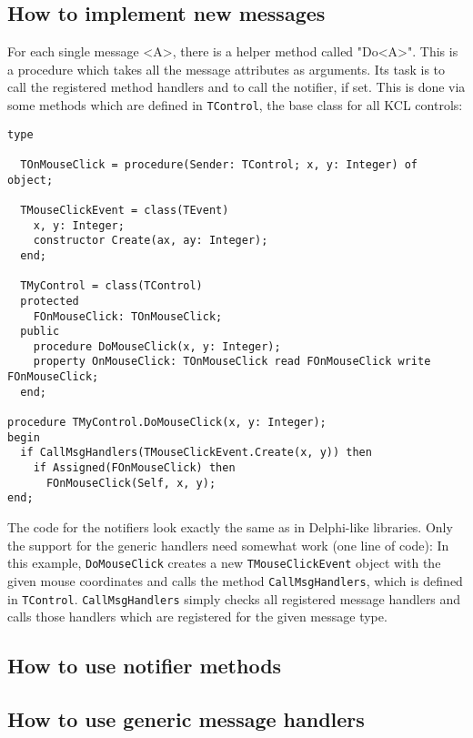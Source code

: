 \documentclass{report}
\begin{document}
\subsection{How to implement new messages}

For each single message <A>, there is a helper method called "Do<A>". This is a
procedure which takes all the message attributes as arguments. Its task is to
call the registered method handlers and to call the notifier, if set. This is
done via some methods which are defined in \texttt{TControl}, the base class for
all KCL controls:
\small
\begin{verbatim}
type

  TOnMouseClick = procedure(Sender: TControl; x, y: Integer) of object;

  TMouseClickEvent = class(TEvent)
    x, y: Integer;
    constructor Create(ax, ay: Integer);
  end;

  TMyControl = class(TControl)
  protected
    FOnMouseClick: TOnMouseClick;
  public
    procedure DoMouseClick(x, y: Integer);
    property OnMouseClick: TOnMouseClick read FOnMouseClick write FOnMouseClick;
  end;

procedure TMyControl.DoMouseClick(x, y: Integer);
begin
  if CallMsgHandlers(TMouseClickEvent.Create(x, y)) then
    if Assigned(FOnMouseClick) then
      FOnMouseClick(Self, x, y);
end;
\end{verbatim}
\normalsize

The code for the notifiers look exactly the same as in Delphi-like libraries.
Only the support for the generic handlers need somewhat work (one line of code):
In this example, \texttt{DoMouseClick} creates a new \texttt{TMouseClickEvent}
object with the given mouse coordinates and calls the method
\texttt{CallMsgHandlers}, which is defined in \texttt{TControl}.
\texttt{CallMsgHandlers} simply checks all registered message handlers and calls
those handlers which are registered for the given message type.

\subsection{How to use notifier methods}

\subsection{How to use generic message handlers}
\end{document}
